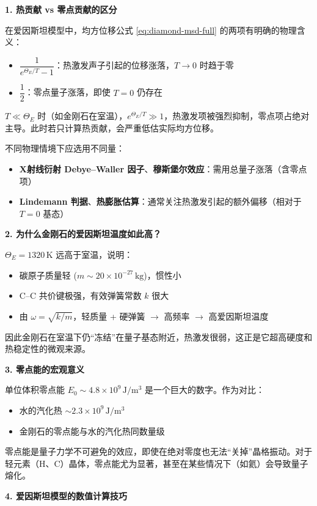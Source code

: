 \begin{insightbox}[物理图像与概念深化]
\textbf{1. 热贡献 vs 零点贡献的区分}

在爱因斯坦模型中，均方位移公式 \eqref{eq:diamond-msd-full} 的两项有明确的物理含义：
\begin{itemize}
    \item $\dfrac{1}{e^{\Theta_E/T}-1}$：热激发声子引起的位移涨落，$T\to0$ 时趋于零
    \item $\dfrac12$：零点量子涨落，即使 $T=0$ 仍存在
\end{itemize}

$T\ll\Theta_E$ 时（如金刚石在室温），$e^{\Theta_E/T}\gg1$，热激发项被强烈抑制，零点项占绝对主导。此时若只计算热贡献，会严重低估实际均方位移。

不同物理情境下应选用不同量：
\begin{itemize}
    \item \textbf{X射线衍射 Debye--Waller 因子}、\textbf{穆斯堡尔效应}：需用总量子涨落（含零点项）
    \item \textbf{Lindemann 判据}、\textbf{热膨胀估算}：通常关注热激发引起的额外偏移（相对于 $T=0$ 基态）
\end{itemize}

\textbf{2. 为什么金刚石的爱因斯坦温度如此高？}

$\Theta_E=1320\,\mathrm{K}$ 远高于室温，说明：
\begin{itemize}
    \item 碳原子质量轻 ($m\sim20\times10^{-27}\,\mathrm{kg}$)，惯性小
    \item C--C 共价键极强，有效弹簧常数 $k$ 很大
    \item 由 $\omega=\sqrt{k/m}$，轻质量 + 硬弹簧 $\to$ 高频率 $\to$ 高爱因斯坦温度
\end{itemize}
因此金刚石在室温下仍``冻结''在量子基态附近，热激发很弱，这正是它超高硬度和热稳定性的微观来源。

\textbf{3. 零点能的宏观意义}

单位体积零点能 $E_0\sim4.8\times10^9\,\mathrm{J/m^3}$ 是一个巨大的数字。作为对比：
\begin{itemize}
    \item 水的汽化热 $\sim2.3\times10^9\,\mathrm{J/m^3}$
    \item 金刚石的零点能与水的汽化热同数量级
\end{itemize}
零点能是量子力学不可避免的效应，即使在绝对零度也无法``关掉''晶格振动。对于轻元素（H、C）晶体，零点能尤为显著，甚至在某些情况下（如氦）会导致量子熔化。

\textbf{4. 爱因斯坦模型的数值计算技巧}


\end{insightbox}
